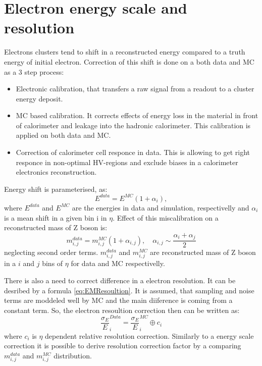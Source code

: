 \section{Electron energy scale and resolution}\label{sec:elecScale}
Electrons clusters tend to shift in a reconstructed energy compared to a truth energy of initial electron. Correction of this shift is done on a both data and MC as a 3 step process:
\begin{itemize}
\item Electronic calibration, that transfers a raw signal from a readout to a cluster energy deposit.
\item MC based calibration. It corrects effects of energy loss in the material in front of calorimeter and leakage into the hadronic calorimeter. This calibration is applied on both data and MC.
\item Correction of calorimeter cell responce in data. This is allowing to get right responce in non-optimal HV-regions and exclude biases in a calorimeter electronics reconstruction.
\end{itemize}

Energy shift is parameterised, as:
\begin{equation}
E^{data}=E^{MC}(1+\alpha_i),
\end{equation}
where $E^{data}$ and $E^{MC}$ are the energies in data and simulation, respectivelly and $\alpha_i$ is a mean shift in a given bin i in $\eta$. Effect of this miscalibration on a reconstructed mass of Z boson is:
\begin{equation}
m_{i,j}^{data}=m_{i,j}^{MC}(1+\alpha_{i,j}), \quad \alpha_{i,j} \sim \frac{\alpha_i+\alpha_j}{2}
\end{equation}
neglecting second order terms. $m_{i,j}^{data}$ and $m_{i,j}^{MC}$ are reconstructed mass of Z boson in a $i$ and $j$ bins of $\eta$ for data and MC respectivelly. 

There is also a need to correct difference in a electron resolution. It can be desribed by a formula \ref{eq:EMResoultion}. It is assumed, that sampling and noise terms are moddeled well by MC and the main diiference is coming from a constant term. 
So, the electron resoultion correction then can be written as:
\begin{equation}
\frac{\sigma_E}{E}^{Data}_{i}=\frac{\sigma_E}{E}^{MC}_{i} \oplus c_i
\end{equation}
where $c_i$ is $\eta$ dependent relative resolution correction. Similarly to a energy scale correction it is possible to derive resolution correction factor by a comparing $m_{i,j}^{data}$ and $m_{i,j}^{MC}$ distribution. 

